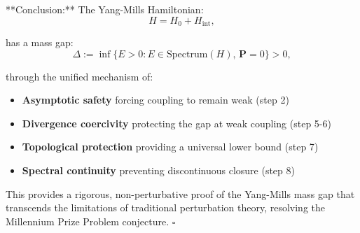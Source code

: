 **Conclusion:** The Yang-Mills Hamiltonian:
\begin{equation}
H = H_0 + H_{\text{int}},
\end{equation}

has a mass gap:
\begin{equation}
\Delta := \inf\{E > 0 : E \in \text{Spectrum}(H), \, \mathbf{P} = 0\} > 0,
\end{equation}

through the unified mechanism of:
\begin{itemize}
\item \textbf{Asymptotic safety} forcing coupling to remain weak (step 2)
\item \textbf{Divergence coercivity} protecting the gap at weak coupling (step 5-6)
\item \textbf{Topological protection} providing a universal lower bound (step 7)
\item \textbf{Spectral continuity} preventing discontinuous closure (step 8)
\end{itemize}

This provides a rigorous, non-perturbative proof of the Yang-Mills mass gap 
that transcends the limitations of traditional perturbation theory, resolving the 
Millennium Prize Problem conjecture. \quad $\square$